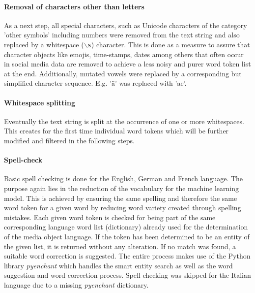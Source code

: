 \paragraph{Removal of characters other than letters} \label{remove_eveything_but_letters}
As a next step, all special characters, such as Unicode characters of the category 'other symbols' including numbers were removed from the text string and also replaced by a whitespace (\texttt{$\backslash$s}) character. This is done as a measure to assure that character objects like emojis, time-stamps, dates among others that often occur in social media data are removed to achieve a less noisy and purer word token list at the end. Additionally, mutated vowels were replaced by a corresponding but simplified character sequence. E.g. '\"a' was replaced with 'ae'.

\paragraph{Whitespace splitting} \label{whitespace_splitting}
Eventually the text string is split at the occurrence of one or more whitespaces. This creates for the first time individual word tokens which will be further modified and filtered in the following steps.

\paragraph{Spell-check} \label{spell_check}
Basic spell checking is done for the English, German and French language. The purpose again lies in the reduction of the vocabulary for the machine learning model. This is achieved by ensuring the same spelling and therefore the same word token for a given word by reducing word variety created through spelling mistakes. Each given word token is checked for being part of the same corresponding language word list (dictionary) already used for the determination of the media object language. If the token has been determined to be an entity of the given list, it is returned without any alteration. If no match was found, a suitable word correction is suggested. The entire process makes use of the Python library \textit{pyenchant} which handles the smart entity search as well as the word suggestion and word correction process. Spell checking was skipped for the Italian language due to a missing \textit{pyenchant} dictionary.

